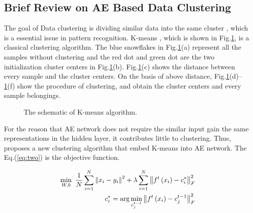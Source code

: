\documentclass[11pt, a4paper, onecolumn, oneside]{article}
\begin{document}
\subsection{Brief Review on AE Based Data Clustering}

The goal of Data clustering is dividing similar data into the same cluster \cite{u}, which is a essential issue in pattern recognition. K-means \cite{aa, ab}, which is shown in Fig.\ref{fig:two}, is a classical clustering algorithm. The blue snowflakes in Fig.\ref{fig:two}(a) represent all the samples without clustering and the red dot and green dot are the two initialization cluster centers in Fig.\ref{fig:two}(b). Fig.\ref{fig:two}(c) shows the distance between every sample and the cluster centers. On the basis of above distance, Fig.\ref{fig:two}(d)–\ref{fig:two}(f) show the procedure of clustering, and obtain the cluster centers and every sample belongings.

\begin{figure}
\centering
{}
\caption{The schematic of K-means algorithm.}
\label{fig:two}
\end{figure}

For the reason that AE network does not require the similar input gain the same representations in the hidden layer, it contributes little to clustering. Thus, \cite{u} proposes a new clustering algorithm that embed K-means into AE network. The Eq.(\ref{eq:two}) is the objective function.

\begin{equation} \label{eq:two}
\begin{split}
\min \limits_{W,b}~\frac {1}{N}\sum \limits _{i = 1}^{N}{{{\left \|{ {x_{i} - {y_{i}}} }\right \|}^{2}}} + \lambda \sum \limits _{i = 1}^{N} {\left \|{ {f^{t}\left ({ {x_{i}} }\right ) - c_{i}^{*}} }\right \|_{F}^{2}} \\
\quad 
\hphantom {\min \limits _{W,b}~}c_{i}^{*} = \arg \min \limits _{c_{j}^{t - 1}} \left \|{ {f^{t}\left ({ {x_{i}} }\right ) - c_{j}^{t - 1}} }\right \|_{F}^{2}
\end{split}
\end{equation}
\end{document}
